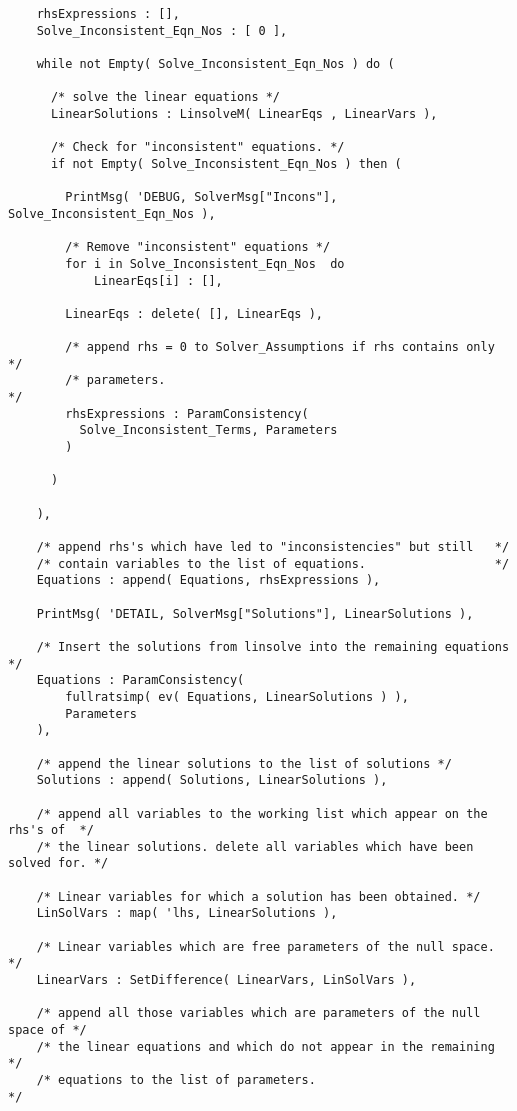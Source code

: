 \begin{verbatim}
    rhsExpressions : [],
    Solve_Inconsistent_Eqn_Nos : [ 0 ],

    while not Empty( Solve_Inconsistent_Eqn_Nos ) do (

      /* solve the linear equations */
      LinearSolutions : LinsolveM( LinearEqs , LinearVars ),

      /* Check for "inconsistent" equations. */
      if not Empty( Solve_Inconsistent_Eqn_Nos ) then (

        PrintMsg( 'DEBUG, SolverMsg["Incons"], Solve_Inconsistent_Eqn_Nos ),

        /* Remove "inconsistent" equations */
        for i in Solve_Inconsistent_Eqn_Nos  do
            LinearEqs[i] : [],

        LinearEqs : delete( [], LinearEqs ),

        /* append rhs = 0 to Solver_Assumptions if rhs contains only */
        /* parameters.                                               */
        rhsExpressions : ParamConsistency(
          Solve_Inconsistent_Terms, Parameters
        )

      )

    ),

    /* append rhs's which have led to "inconsistencies" but still   */
    /* contain variables to the list of equations.                  */
    Equations : append( Equations, rhsExpressions ),

    PrintMsg( 'DETAIL, SolverMsg["Solutions"], LinearSolutions ),

    /* Insert the solutions from linsolve into the remaining equations */
    Equations : ParamConsistency(
        fullratsimp( ev( Equations, LinearSolutions ) ),
        Parameters
    ),

    /* append the linear solutions to the list of solutions */
    Solutions : append( Solutions, LinearSolutions ),

    /* append all variables to the working list which appear on the rhs's of  */
    /* the linear solutions. delete all variables which have been solved for. */

    /* Linear variables for which a solution has been obtained. */
    LinSolVars : map( 'lhs, LinearSolutions ),

    /* Linear variables which are free parameters of the null space. */
    LinearVars : SetDifference( LinearVars, LinSolVars ),

    /* append all those variables which are parameters of the null space of */
    /* the linear equations and which do not appear in the remaining        */
    /* equations to the list of parameters.                                 */


\end{verbatim}
